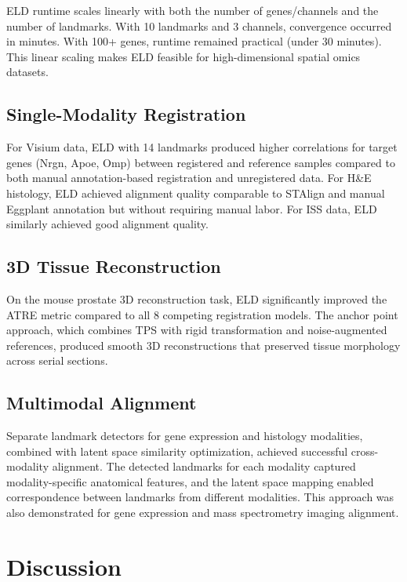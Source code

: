 \documentclass[11pt]{article}
\begin{document}
ELD runtime scales linearly with both the number of genes/channels and the number of landmarks. With 10 landmarks and 3 channels, convergence occurred in minutes. With 100+ genes, runtime remained practical (under 30 minutes). This linear scaling makes ELD feasible for high-dimensional spatial omics datasets.

\subsection{Single-Modality Registration}

For Visium data, ELD with 14 landmarks produced higher correlations for target genes (Nrgn, Apoe, Omp) between registered and reference samples compared to both manual annotation-based registration and unregistered data. For H\&E histology, ELD achieved alignment quality comparable to STAlign and manual Eggplant annotation but without requiring manual labor. For ISS data, ELD similarly achieved good alignment quality.

\subsection{3D Tissue Reconstruction}

On the mouse prostate 3D reconstruction task, ELD significantly improved the ATRE metric compared to all 8 competing registration models. The anchor point approach, which combines TPS with rigid transformation and noise-augmented references, produced smooth 3D reconstructions that preserved tissue morphology across serial sections.

\subsection{Multimodal Alignment}

Separate landmark detectors for gene expression and histology modalities, combined with latent space similarity optimization, achieved successful cross-modality alignment. The detected landmarks for each modality captured modality-specific anatomical features, and the latent space mapping enabled correspondence between landmarks from different modalities. This approach was also demonstrated for gene expression and mass spectrometry imaging alignment.

\section{Discussion}
\end{document}
